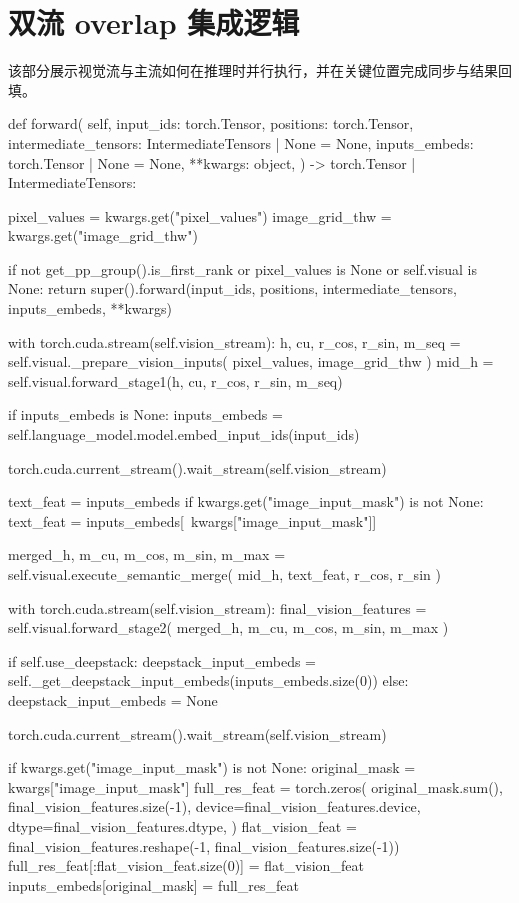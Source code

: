 \section{双流 overlap 集成逻辑}
该部分展示视觉流与主流如何在推理时并行执行，并在关键位置完成同步与结果回填。
\begin{CodeBlock}
def forward(
    self,
    input_ids: torch.Tensor,
    positions: torch.Tensor,
    intermediate_tensors: IntermediateTensors | None = None,
    inputs_embeds: torch.Tensor | None = None,
    **kwargs: object,
) -> torch.Tensor | IntermediateTensors:

    pixel_values = kwargs.get("pixel_values")
    image_grid_thw = kwargs.get("image_grid_thw")

    if not get_pp_group().is_first_rank or pixel_values is None or self.visual is None:
        return super().forward(input_ids, positions, intermediate_tensors, inputs_embeds, **kwargs)

    with torch.cuda.stream(self.vision_stream):
        h, cu, r_cos, r_sin, m_seq = self.visual._prepare_vision_inputs(
            pixel_values, image_grid_thw
        )
        mid_h = self.visual.forward_stage1(h, cu, r_cos, r_sin, m_seq)

    if inputs_embeds is None:
        inputs_embeds = self.language_model.model.embed_input_ids(input_ids)

    torch.cuda.current_stream().wait_stream(self.vision_stream)

    text_feat = inputs_embeds
    if kwargs.get("image_input_mask") is not None:
        text_feat = inputs_embeds[~kwargs["image_input_mask"]]

    merged_h, m_cu, m_cos, m_sin, m_max = self.visual.execute_semantic_merge(
        mid_h, text_feat, r_cos, r_sin
    )

    with torch.cuda.stream(self.vision_stream):
        final_vision_features = self.visual.forward_stage2(
            merged_h, m_cu, m_cos, m_sin, m_max
        )

    if self.use_deepstack:
        deepstack_input_embeds = self._get_deepstack_input_embeds(inputs_embeds.size(0))
    else:
        deepstack_input_embeds = None

    torch.cuda.current_stream().wait_stream(self.vision_stream)

    if kwargs.get("image_input_mask") is not None:
        original_mask = kwargs["image_input_mask"]
        full_res_feat = torch.zeros(
            original_mask.sum(),
            final_vision_features.size(-1),
            device=final_vision_features.device,
            dtype=final_vision_features.dtype,
        )
        flat_vision_feat = final_vision_features.reshape(-1, final_vision_features.size(-1))
        full_res_feat[:flat_vision_feat.size(0)] = flat_vision_feat
        inputs_embeds[original_mask] = full_res_feat


\end{CodeBlock}
